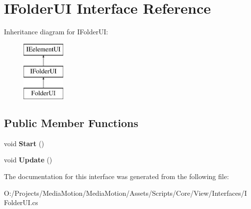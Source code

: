 \hypertarget{interface_i_folder_u_i}{\section{I\+Folder\+U\+I Interface Reference}
\label{interface_i_folder_u_i}
}
Inheritance diagram for I\+Folder\+U\+I\+:\begin{figure}[H]
\begin{center}
\leavevmode
\includegraphics[height=3.000000cm]{interface_i_folder_u_i}
\end{center}
\end{figure}
\subsection*{Public Member Functions}
\begin{DoxyCompactItemize}
\item 
\hypertarget{interface_i_folder_u_i_a2a1eb0bf1ab713996866a6950bbd395c}{void {\bfseries Start} ()}\label{interface_i_folder_u_i_a2a1eb0bf1ab713996866a6950bbd395c}

\item 
\hypertarget{interface_i_folder_u_i_a7531d45be72de5738e999efdb92d2324}{void {\bfseries Update} ()}\label{interface_i_folder_u_i_a7531d45be72de5738e999efdb92d2324}

\end{DoxyCompactItemize}


The documentation for this interface was generated from the following file\+:\begin{DoxyCompactItemize}
\item 
O\+:/\+Projects/\+Media\+Motion/\+Media\+Motion/\+Assets/\+Scripts/\+Core/\+View/\+Interfaces/I\+Folder\+U\+I.\+cs\end{DoxyCompactItemize}
